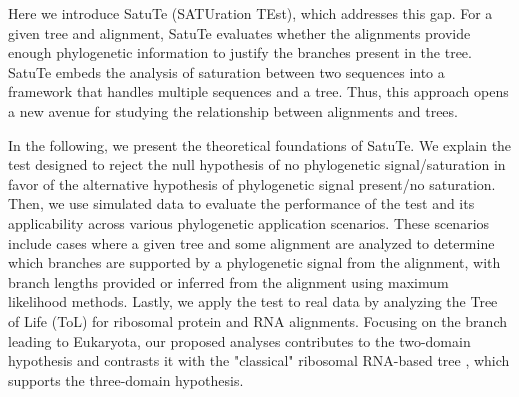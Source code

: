 \medskip 
Here we introduce SatuTe (SATUration TEst), which addresses this gap. For a given tree and alignment, SatuTe evaluates whether the alignments provide enough phylogenetic information to justify the branches present in the tree. SatuTe embeds the analysis of saturation between two sequences into a framework that handles multiple sequences and a tree. Thus, this approach opens a new avenue for studying the relationship between alignments and  trees.

\medskip 

In the following, we present the theoretical foundations of SatuTe. We explain the test designed to reject the null hypothesis of no phylogenetic signal/saturation in favor of the alternative hypothesis of phylogenetic signal present/no saturation. Then, we use simulated data to evaluate the performance of the test and its applicability across various phylogenetic application scenarios. These scenarios include cases where a given  tree and some alignment  are analyzed to determine which branches are supported by a phylogenetic signal from the alignment, with branch lengths provided or inferred from the alignment using maximum likelihood methods. Lastly, we apply the test to real data by analyzing the Tree of Life (ToL) for ribosomal protein and RNA alignments. Focusing on the branch leading to Eukaryota, our proposed analyses contributes to the two-domain hypothesis  and contrasts it with the "classical" ribosomal RNA-based tree , which supports the three-domain hypothesis.



%


